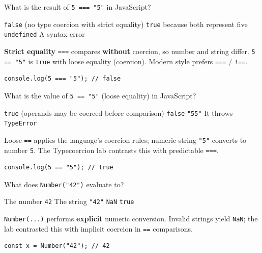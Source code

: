 \question[4]
What is the result of \texttt{5 === "5"} in JavaScript?
\begin{choices}
  \CorrectChoice \texttt{false} (no type coercion with strict equality)
  \choice \texttt{true} because both represent five
  \choice \texttt{undefined}
  \choice A syntax error
\end{choices}
\begin{solution}
  \textbf{Strict equality} \texttt{===} compares \textbf{without} coercion, so number and string differ. \texttt{5 == "5"} is \texttt{true} with loose equality (coercion). Modern style prefers \texttt{===} / \texttt{!==}.
\begin{lstlisting}[style=jsexam]
console.log(5 === "5"); // false
\end{lstlisting}
\end{solution}


\newpage
\question[4]
What is the value of \texttt{5 == "5"} (loose equality) in JavaScript?
\begin{choices}
  \CorrectChoice \texttt{true} (operands may be coerced before comparison)
  \choice \texttt{false}
  \choice \texttt{"55"}
  \choice It throws \texttt{TypeError}
\end{choices}
\begin{solution}
  Loose \texttt{==} applies the language's coercion rules; numeric string \texttt{"5"} converts to number \texttt{5}. The Typecoercion lab contrasts this with predictable \texttt{===}.
\begin{lstlisting}[style=jsexam]
console.log(5 == "5"); // true
\end{lstlisting}
\end{solution}

\question[4]
What does \texttt{Number("42")} evaluate to?
\begin{choices}
  \CorrectChoice The number \texttt{42}
  \choice The string \texttt{"42"}
  \choice \texttt{NaN}
  \choice \texttt{true}
\end{choices}
\begin{solution}
  \texttt{Number(...)} performs \textbf{explicit} numeric conversion. Invalid strings yield \texttt{NaN}; the lab contrasted this with implicit coercion in \texttt{==} comparisons.
\begin{lstlisting}[style=jsexam]
const x = Number("42"); // 42
\end{lstlisting}
\end{solution}

